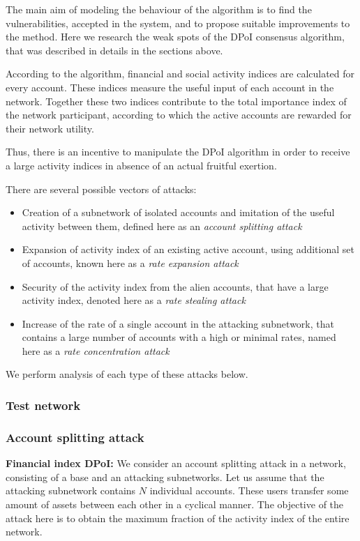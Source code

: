 \documentclass[a4paper,12pt]{article}
\begin{document}
The main aim of modeling the behaviour of the algorithm is to find the vulnerabilities, accepted in the system, and to propose suitable improvements to the method. Here we research the weak spots of the DPoI consensus algorithm, that was described in details in the sections above. 

According to the algorithm, financial and social activity indices are calculated for every account. These indices measure the useful input of each account in the network. Together these two indices contribute to the total importance index of the network participant, according to which the active accounts are rewarded for their network utility.

Thus, there is an incentive to manipulate the DPoI algorithm in order to receive a large activity indices in absence of an actual fruitful exertion. 

There are several possible vectors of attacks:

\begin{itemize}
 \item Creation of a subnetwork of isolated accounts and imitation of the useful activity between them, defined here as an \emph{account splitting attack}
 \item Expansion of activity index of an existing active account, using additional set of accounts, known here as a \emph{rate expansion attack}
 \item Security of the activity index from the alien accounts, that have a large activity index, denoted here as a \emph{rate stealing attack}
 \item Increase of the rate of a single account in the attacking subnetwork, that contains a large number of accounts with a high or minimal rates, named here as a \emph{rate concentration attack} 
 \end{itemize}

We perform analysis of each type of these attacks below.
\subsubsection{Test network}

\subsubsection{Account splitting attack}

\textbf{Financial index DPoI:} We consider an account splitting attack in a network, consisting of a base and an attacking subnetworks. Let us assume that the attacking subnetwork contains $N$ individual accounts. These users transfer some amount of assets between each other in a cyclical manner. The objective of the attack here is to obtain the maximum fraction of the activity index of the entire network.
\end{document}
